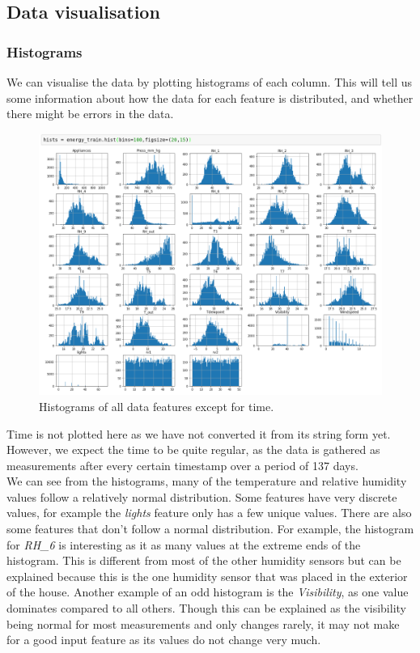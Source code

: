 \documentclass{article}
\newcommand{\n}[0]{\\[\baselineskip]}
\begin{document}
\subsection{Data visualisation}

\subsubsection{Histograms}
We can visualise the data by plotting histograms of each column. This will tell us some information about how the data for each feature is distributed, and whether there might be errors in the data.

\begin{figure}[H]
\centering
\includegraphics[width=1\textwidth, keepaspectratio]{imgs/histograms.png}
\caption{Histograms of all data features except for time.}
\end{figure}
\noindent
Time is not plotted here as we have not converted it from its string form yet. However, we expect the time to be quite regular, as the data is gathered as measurements after every certain timestamp over a period of 137 days. 
\n
We can see from the histograms, many of the temperature and relative humidity values follow a relatively normal distribution. Some features have very discrete values, for example the \textit{lights} feature only has a few unique values. There are also some features that don't follow a normal distribution. For example, the histogram for \textit{RH\_6} is interesting as it as many values at the extreme ends of the histogram. This is different from most of the other humidity sensors but can be explained because this is the one humidity sensor that was placed in the exterior of the house. Another example of an odd histogram is the \textit{Visibility}, as one value dominates compared to all others. Though this can be explained as the visibility being normal for most measurements and only changes rarely, it may not make for a good input feature as its values do not change very much.
\end{document}
